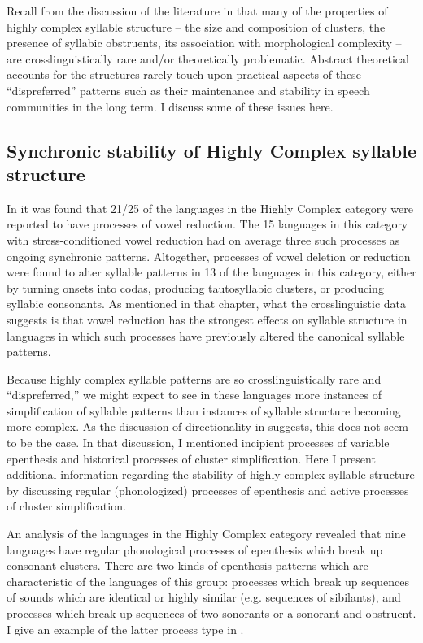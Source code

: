   Recall from the discussion of the literature in  that many of the properties of highly complex syllable structure -- the size and composition of clusters, the presence of syllabic obstruents, its association with morphological complexity -- are crosslinguistically rare and/or theoretically problematic. Abstract theoretical accounts for the structures rarely touch upon practical aspects of these ``dispreferred'' patterns such as their maintenance and stability in speech communities in the long term. I discuss some of these issues here.

\subsection{Synchronic stability of Highly Complex syllable structure}\label{sec:8.5.1}

  In  it was found that 21/25 of the languages in the Highly Complex category were reported to have processes of vowel reduction. The 15 languages in this category with stress-conditioned vowel reduction had on average three such processes as ongoing synchronic patterns. Altogether, processes of vowel deletion or reduction were found to alter syllable patterns in 13 of the languages in this category, either by turning onsets into codas, producing tautosyllabic clusters, or producing syllabic consonants. As mentioned in that chapter, what the crosslinguistic data suggests is that vowel reduction has the strongest effects on syllable structure in languages in which such processes have previously altered the canonical syllable patterns.

  Because highly complex syllable patterns are so crosslinguistically rare and ``dispreferred,'' we might expect to see in these languages more instances of simplification of syllable patterns than instances of syllable structure becoming more complex. As the discussion of directionality in  suggests, this does not seem to be the case. In that discussion, I mentioned incipient processes of variable epenthesis and historical processes of cluster simplification. Here I present additional information regarding the stability of highly complex syllable structure by discussing regular (phonologized) processes of epenthesis and active processes of cluster simplification.

  An analysis of the languages in the Highly Complex category revealed that nine languages have regular phonological processes of epenthesis which break up consonant clusters. There are two kinds of epenthesis patterns which are characteristic of the languages of this group: processes which break up sequences of sounds which are identical or highly similar (e.g. sequences of sibilants), and processes which break up sequences of two sonorants or a sonorant and obstruent. I give an example of the latter process type in .

